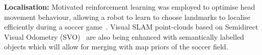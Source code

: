 \documentclass{llncs}
\begin{document}
\noindent\textbf{Localisation:}  
Motivated reinforcement learning was employed to optimise head movement behaviour, allowing a robot to learn to choose landmarks to localise efficiently during a soccer game~\cite{FountainEtAl2014}. Visual SLAM point-clouds based on Semidirect Visual Odometry (SVO)~\cite{forster2017svo} are also being enhanced with semantically labelled objects which will allow for merging with map priors of the soccer field.






\end{document}
